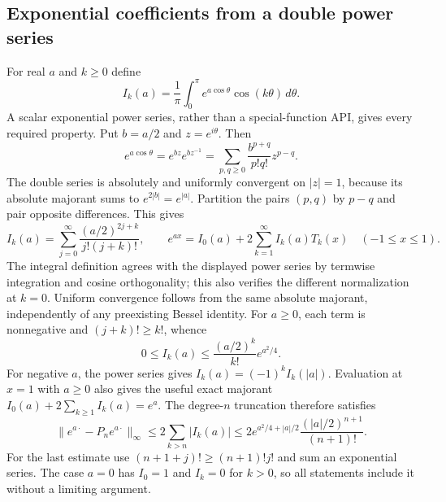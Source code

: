 \documentclass[11pt]{article}
\theoremstyle{remark}
\numberwithin{equation}{section}
\begin{document}
\subsection{Exponential coefficients from a double power series}
\label{polyseries:bessel}
For real $a$ and $k\ge0$ define
\[
 I_k(a)=\frac1\pi\int_0^\pi e^{a\cos\theta}\cos(k\theta)\,d\theta.
\]
A scalar exponential power series, rather than a special-function API,
gives every required property. Put $b=a/2$ and $z=e^{i\theta}$. Then
\[
 e^{a\cos\theta}=e^{bz}e^{bz^{-1}}
 =\sum_{p,q\ge0}\frac{b^{p+q}}{p!q!}z^{p-q}.
\]
The double series is absolutely and uniformly convergent on $|z|=1$,
because its absolute majorant sums to $e^{2|b|}=e^{|a|}$.
Partition the pairs $(p,q)$ by $p-q$ and pair opposite differences.
This gives
\begin{equation}\label{polyseries:besselseries}
 I_k(a)=\sum_{j=0}^\infty\frac{(a/2)^{2j+k}}{j!(j+k)!},\qquad
 e^{ax}=I_0(a)+2\sum_{k=1}^\infty I_k(a)T_k(x)
 \quad(-1\le x\le1).
\end{equation}
The integral definition agrees with the displayed power series by
termwise integration and cosine orthogonality; this also verifies the
different normalization at $k=0$. Uniform convergence follows from the
same absolute majorant, independently of any preexisting Bessel identity.
For $a\ge0$, each term is nonnegative and $(j+k)!\ge k!$, whence
\begin{equation}\label{polyseries:besselbound}
 0\le I_k(a)\le\frac{(a/2)^k}{k!}e^{a^2/4}.
\end{equation}
For negative $a$, the power series gives $I_k(a)=(-1)^kI_k(|a|)$.
Evaluation at $x=1$ with $a\ge0$ also gives the useful exact majorant
$I_0(a)+2\sum_{k\ge1}I_k(a)=e^a$.
The degree-$n$ truncation therefore satisfies
\[
 \|e^{a\cdot}-P_ne^{a\cdot}\|_\infty
 \le2\sum_{k>n}|I_k(a)|
 \le2e^{a^2/4+|a|/2}\frac{(|a|/2)^{n+1}}{(n+1)!}.
\]
For the last estimate use $(n+1+j)!\ge(n+1)!j!$ and sum an
exponential series. The case $a=0$ has $I_0=1$ and $I_k=0$ for $k>0$,
so all statements include it without a limiting argument.
\end{document}
